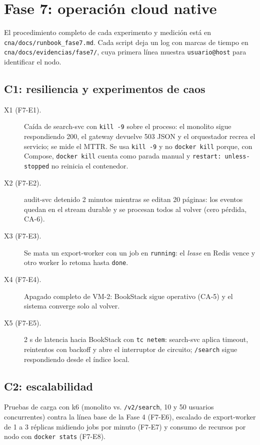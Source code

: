 \documentclass[11pt,a4paper]{article}
\begin{document}
\newpage
\section{Fase 7: operación cloud native}
El procedimiento completo de cada experimento y medición está en \texttt{cna/docs/runbook\_fase7.md}. Cada script deja un log con marcas de tiempo en \texttt{cna/docs/evidencias/fase7/}, cuya primera línea muestra \texttt{usuario@host} para identificar el nodo.

\subsection{C1: resiliencia y experimentos de caos}
\begin{description}
  \item[X1 (F7-E1).] Caída de search-svc con \texttt{kill -9} sobre el proceso: el monolito sigue respondiendo 200, el gateway devuelve 503 JSON y el orquestador recrea el servicio; se mide el MTTR. Se usa \texttt{kill -9} y no \texttt{docker kill} porque, con Compose, \texttt{docker kill} cuenta como parada manual y \texttt{restart: unless-stopped} no reinicia el contenedor.
  \item[X2 (F7-E2).] audit-svc detenido 2 minutos mientras se editan 20 páginas: los eventos quedan en el stream durable y se procesan todos al volver (cero pérdida, CA-6).
  \item[X3 (F7-E3).] Se mata un export-worker con un job en \texttt{running}: el \emph{lease} en Redis vence y otro worker lo retoma hasta \texttt{done}.
  \item[X4 (F7-E4).] Apagado completo de VM-2: BookStack sigue operativo (CA-5) y el sistema converge solo al volver.
  \item[X5 (F7-E5).] 2 s de latencia hacia BookStack con \texttt{tc netem}: search-svc aplica timeout, reintentos con backoff y abre el interruptor de circuito; \texttt{/search} sigue respondiendo desde el índice local.
\end{description}

\subsection{C2: escalabilidad}
Pruebas de carga con k6 (monolito vs. \texttt{/v2/search}, 10 y 50 usuarios concurrentes) contra la línea base de la Fase 4 (F7-E6), escalado de export-worker de 1 a 3 réplicas midiendo jobs por minuto (F7-E7) y consumo de recursos por nodo con \texttt{docker stats} (F7-E8).
\end{document}

